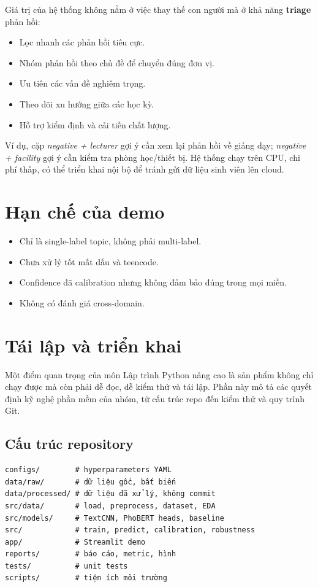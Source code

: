 \documentclass[12pt,a4paper]{report}
\begin{document}
Giá trị của hệ thống không nằm ở việc thay thế con người mà ở khả năng \textbf{triage} phản hồi:

\begin{itemize}[leftmargin=1.2cm]
  \item Lọc nhanh các phản hồi tiêu cực.
  \item Nhóm phản hồi theo chủ đề để chuyển đúng đơn vị.
  \item Ưu tiên các vấn đề nghiêm trọng.
  \item Theo dõi xu hướng giữa các học kỳ.
  \item Hỗ trợ kiểm định và cải tiến chất lượng.
\end{itemize}

Ví dụ, cặp \textit{negative + lecturer} gợi ý cần xem lại phản hồi về giảng dạy; \textit{negative + facility} gợi ý cần kiểm tra phòng học/thiết bị. Hệ thống chạy trên CPU, chi phí thấp, có thể triển khai nội bộ để tránh gửi dữ liệu sinh viên lên cloud.

\section{Hạn chế của demo}

\begin{itemize}[leftmargin=1.2cm]
  \item Chỉ là single-label topic, không phải multi-label.
  \item Chưa xử lý tốt mất dấu và teencode.
  \item Confidence đã calibration nhưng không đảm bảo đúng trong mọi miền.
  \item Không có đánh giá cross-domain.
\end{itemize}


\section{Tái lập và triển khai}

Một điểm quan trọng của môn Lập trình Python nâng cao là sản phẩm không chỉ chạy được mà còn phải dễ đọc, dễ kiểm thử và tái lập. Phần này mô tả các quyết định kỹ nghệ phần mềm của nhóm, từ cấu trúc repo đến kiểm thử và quy trình Git.

\subsection{Cấu trúc repository}

\begin{verbatim}
configs/        # hyperparameters YAML
data/raw/       # dữ liệu gốc, bất biến
data/processed/ # dữ liệu đã xử lý, không commit
src/data/       # load, preprocess, dataset, EDA
src/models/     # TextCNN, PhoBERT heads, baseline
src/            # train, predict, calibration, robustness
app/            # Streamlit demo
reports/        # báo cáo, metric, hình
tests/          # unit tests
scripts/        # tiện ích môi trường
\end{verbatim}
\end{document}
